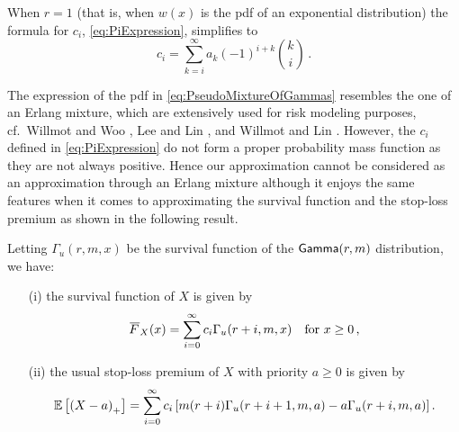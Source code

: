 \begin{remark}
When $r=1$ (that is, when $w(x)$ is the pdf of an exponential distribution) the formula for $c_i$, \eqref{eq:PiExpression}, simplifies to
\[ c_i = \sum_{k=i}^\infty a_k (-1)^{i+k} \binom{k}{i} \,. \]
\remQED
\end{remark}

The expression of the pdf in \eqref{eq:PseudoMixtureOfGammas} resembles the one of an Erlang mixture, which are extensively used for risk modeling purposes, cf.\ Willmot and Woo \cite{WiWo07}, Lee and Lin \cite{LeLi10}, and Willmot and Lin \cite{WiLi11}. However, the $c_i$ defined in \eqref{eq:PiExpression} do not form a proper probability mass function as they are not always positive. Hence our approximation cannot be considered as an approximation through an Erlang mixture although it enjoys the same features when it comes to approximating the survival function and the stop-loss premium as shown in the following result.
\begin{proposition} \label{prop:OrthogonalPolynomialForm}
Letting $\Gamma_u(r,m,x)$ be the survival function of the $\mathsf{Gamma}(r,m)$ distribution,  we have:
\begin{itemize}
\item[(i)] the survival function of $X$ is given by
\begin{equation}\label{eq:TailFunctionX}
\Ftail_{X}(x) = \sum_{i=0}^{\infty}c_i\Gamma_{u}(r+i,m,x) \quad \text{for } x \ge 0 \,,
\end{equation}
\item[(ii)] the usual stop-loss premium of $X$ with priority $a \ge 0$ is given by
\begin{equation}
\operatorname{{\mathbb E}}\left[\left(X-a\right)_{+}\right] = \sum_{i=0}^{\infty}c_i\left[m (r+i) \Gamma_{u}(r+i+1,m,a)-a\Gamma_{u}(r+i,m,a)\right]. \label{eq:UsualStoplossX}
\end{equation}
\end{itemize}
\end{proposition}
